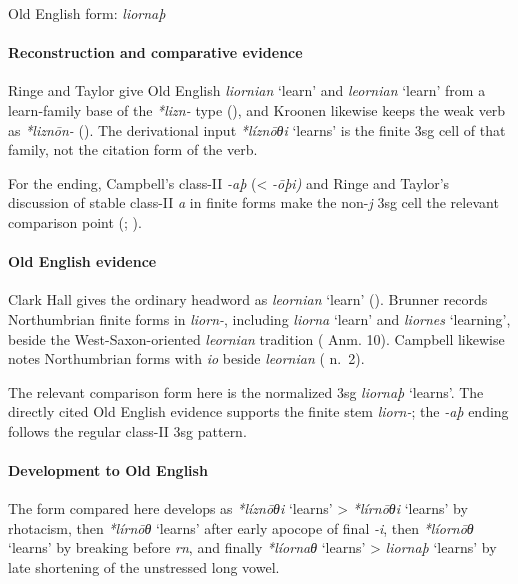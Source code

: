 \documentclass[
  british,
  a4paper,
]{article}
\providecommand{\Recon}[1]{\emph{*#1}}
\begin{document}
Old English form: \emph{liornaþ}

\paragraph{Reconstruction and comparative
evidence}\label{reconstruction-and-comparative-evidence-139}

Ringe and Taylor give Old English {\emph{liornian}} `learn' and
{\emph{leornian}} `learn' from a learn-family base of the \emph{*lizn-}
type (), and
Kroonen likewise keeps the weak verb as \emph{*liznōn-}
(). The derivational input
\Recon{líznōθi} `learns' is the finite 3sg cell of that family, not the
citation form of the verb.

For the ending, Campbell's class-II \emph{-aþ} (\textless{} \emph{-ōþi)}
and Ringe and Taylor's discussion of stable class-II \emph{a} in finite
forms make the non-\emph{j} 3sg cell the relevant comparison point
(;
).

\paragraph{Old English evidence}\label{old-english-evidence-139}

Clark Hall gives the ordinary headword as {\emph{leornian}} `learn'
(). Brunner records
Northumbrian finite forms in \emph{liorn-}, including {\emph{liorna}}
`learn' and {\emph{liornes}} `learning', beside the West-Saxon-oriented
{\emph{leornian}} tradition ( Anm. 10). Campbell likewise notes Northumbrian forms
with \emph{io} beside \emph{leornian}
( n.~2).

The relevant comparison form here is the normalized 3sg {\emph{liornaþ}}
`learns'. The directly cited Old English evidence supports the finite
stem \emph{liorn-}; the \emph{-aþ} ending follows the regular class-II
3sg pattern.

\paragraph{Development to Old
English}\label{development-to-old-english-139}

The form compared here develops as \Recon{líznōθi} `learns'
\textgreater{} \Recon{lírnōθi} `learns' by rhotacism, then
\Recon{lírnōθ} `learns' after early apocope of final \emph{-i}, then
\Recon{líornōθ} `learns' by breaking before \emph{rn}, and finally
\Recon{líornaθ} `learns' \textgreater{} {\emph{liornaþ}} `learns' by
late shortening of the unstressed long vowel.
\end{document}
